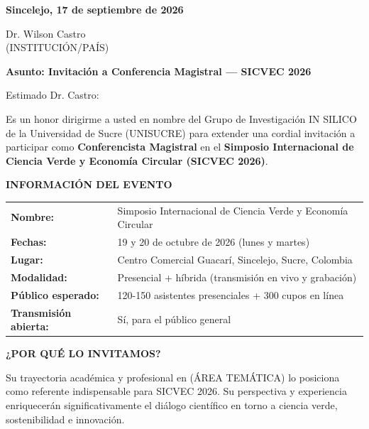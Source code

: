 \documentclass[12pt,a4paper]{article}
\begin{document}
\vspace{0.5cm}

\noindent
\textbf{Sincelejo, 17 de septiembre de 2026}

\vspace{0.8cm}

\noindent
Dr. Wilson Castro\\
(INSTITUCIÓN/PAÍS)

\vspace{0.8cm}

\noindent
\textbf{\large Asunto: Invitación a Conferencia Magistral — SICVEC 2026}

\vspace{0.8cm}

Estimado Dr. Castro:

\vspace{0.8cm}

Es un honor dirigirme a usted en nombre del Grupo de Investigación IN SILICO de la Universidad de Sucre (UNISUCRE) para extender una cordial invitación a participar como \textbf{Conferencista Magistral} en el \textbf{Simposio Internacional de Ciencia Verde y Economía Circular (SICVEC 2026)}.

\vspace{0.5cm}

\noindent
\textbf{INFORMACIÓN DEL EVENTO}

\begin{tabular}{ll}
\textbf{Nombre:} & Simposio Internacional de Ciencia Verde y Economía Circular \\
\textbf{Fechas:} & 19 y 20 de octubre de 2026 (lunes y martes) \\
\textbf{Lugar:} & Centro Comercial Guacarí, Sincelejo, Sucre, Colombia \\
\textbf{Modalidad:} & Presencial + híbrida (transmisión en vivo y grabación) \\
\textbf{Público esperado:} & 120-150 asistentes presenciales + 300 cupos en línea \\
\textbf{Transmisión abierta:} & Sí, para el público general \\
\end{tabular}

\vspace{0.5cm}

\noindent
\textbf{¿POR QUÉ LO INVITAMOS?}

Su trayectoria académica y profesional en (ÁREA TEMÁTICA) lo posiciona como referente indispensable para SICVEC 2026. Su perspectiva y experiencia enriquecerán significativamente el diálogo científico en torno a ciencia verde, sostenibilidad e innovación.
\end{document}
